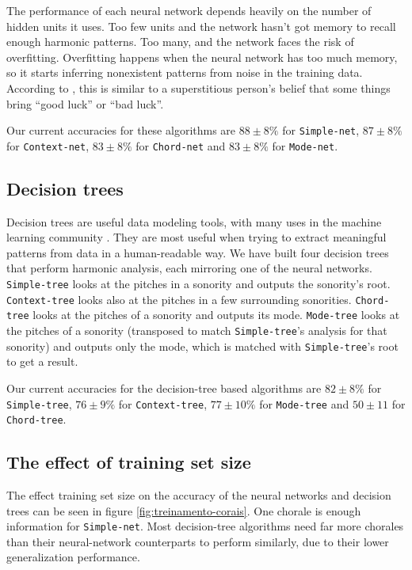 \documentclass{article}
\begin{document}
The performance of each neural network depends heavily on the number
of hidden units it uses. Too few units and the network hasn't got
memory to recall enough harmonic patterns. Too many, and the network
faces the risk of overfitting. Overfitting happens when the neural
network has too much memory, so it starts inferring nonexistent
patterns from noise in the training data. According to
\cite{white.ea:superstitious}, this is similar to a superstitious
person's belief that some things bring ``good luck'' or ``bad luck''.

Our current accuracies for these algorithms are $88\pm 8\%$ for
\texttt{Simple-net}, $87 \pm 8\%$ for \texttt{Context-net}, $83 \pm
8\%$ for \texttt{Chord-net} and $83 \pm 8\%$ for \texttt{Mode-net}.

\subsection{Decision trees}
\label{sec:decision-trees}

Decision trees are useful data modeling tools, with many uses in the
machine learning community \cite{mitchell:machine,
  russell.ea:artificial}. They are most useful when trying to extract
meaningful patterns from data in a human-readable way. We have built
four decision trees that perform harmonic analysis, each mirroring one
of the neural networks. \texttt{Simple-tree} looks at the pitches in a
sonority and outputs the sonority's root. \texttt{Context-tree} looks
also at the pitches in a few surrounding
sonorities. \texttt{Chord-tree} looks at the pitches of a sonority and
outputs its mode. \texttt{Mode-tree} looks at the pitches of a
sonority (transposed to match \texttt{Simple-tree}'s analysis for that
sonority) and outputs only the mode, which is matched with
\texttt{Simple-tree}'s root to get a result.

Our current accuracies for the decision-tree based algorithms are $82
\pm 8\%$ for \texttt{Simple-tree}, $76 \pm 9\%$ for
\texttt{Context-tree}, $77 \pm 10\%$ for \texttt{Mode-tree} and $50
\pm 11$ for \texttt{Chord-tree}.

\subsection{The effect of training set size}

The effect training set size on the accuracy of the neural networks
and decision trees can be seen in figure
\ref{fig:treinamento-corais}. One chorale is enough information for
\texttt{Simple-net}. Most decision-tree algorithms need far more
chorales than their neural-network counterparts to perform similarly,
due to their lower generalization performance.
\end{document}
